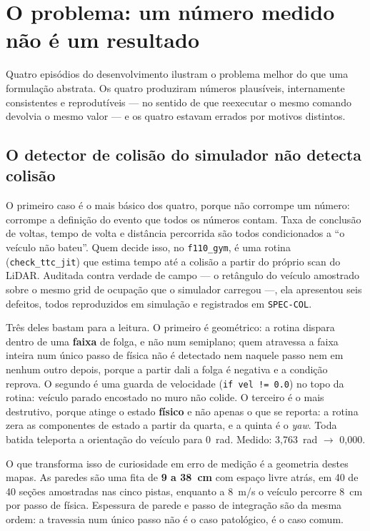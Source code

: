 \section{O problema: um número medido não é um resultado}\label{sec:val-problema}

Quatro episódios do desenvolvimento ilustram o problema melhor do que uma
formulação abstrata. Os quatro produziram números plausíveis, internamente
consistentes e reprodutíveis --- no sentido de que reexecutar o mesmo comando
devolvia o mesmo valor --- e os quatro estavam errados por motivos distintos.

\subsection{O detector de colisão do simulador não detecta
colisão}\label{sec:val-colisao}

O primeiro caso é o mais básico dos quatro, porque não corrompe um número: corrompe
a definição do evento que todos os números contam. Taxa de conclusão de voltas,
tempo de volta e distância percorrida são todos condicionados a ``o veículo não
bateu''. Quem decide isso, no \texttt{f110\_gym}, é uma rotina
(\texttt{check\_ttc\_jit}) que estima tempo até a colisão a partir do próprio scan
do LiDAR. Auditada contra verdade de campo --- o retângulo do veículo amostrado
sobre o mesmo grid de ocupação que o simulador carregou ---, ela apresentou seis
defeitos, todos reproduzidos em simulação e registrados em \texttt{SPEC-COL}.

Três deles bastam para a leitura. O primeiro é geométrico: a rotina dispara dentro
de uma \textbf{faixa} de folga, e não num semiplano; quem atravessa a faixa inteira
num único passo de física não é detectado nem naquele passo nem em nenhum outro
depois, porque a partir dali a folga é negativa e a condição reprova. O segundo é
uma guarda de velocidade (\texttt{if vel != 0.0}) no topo da rotina: veículo parado
encostado no muro não colide. O terceiro é o mais destrutivo, porque atinge o estado
\textbf{físico} e não apenas o que se reporta: a rotina zera as componentes de
estado a partir da quarta, e a quinta é o \textit{yaw}. Toda batida teleporta a
orientação do veículo para 0~rad. Medido: 3,763~rad $\rightarrow$ 0,000.

O que transforma isso de curiosidade em erro de medição é a geometria destes mapas.
As paredes são uma fita de \textbf{9 a 38~cm} com espaço livre atrás, em 40 de 40
seções amostradas nas cinco pistas, enquanto a 8~m/s o veículo percorre 8~cm por
passo de física. Espessura de parede e passo de integração são da mesma ordem: a
travessia num único passo não é o caso patológico, é o caso comum.

